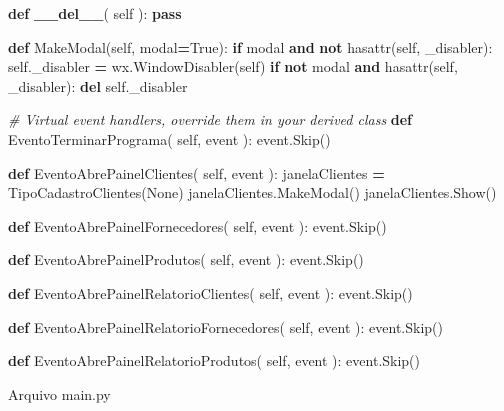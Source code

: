 \documentclass[
]{book}
\newenvironment{Shaded}{\begin{snugshade}}{\end{snugshade}}
\newcommand{\BuiltInTok}[1]{#1}
\newcommand{\CommentTok}[1]{\textcolor[rgb]{0.56,0.35,0.01}{\textit{#1}}}
\newcommand{\ControlFlowTok}[1]{\textcolor[rgb]{0.13,0.29,0.53}{\textbf{#1}}}
\newcommand{\FunctionTok}[1]{\textcolor[rgb]{0.13,0.29,0.53}{\textbf{#1}}}
\newcommand{\KeywordTok}[1]{\textcolor[rgb]{0.13,0.29,0.53}{\textbf{#1}}}
\newcommand{\NormalTok}[1]{#1}
\newcommand{\OperatorTok}[1]{\textcolor[rgb]{0.81,0.36,0.00}{\textbf{#1}}}
\newcommand{\StringTok}[1]{\textcolor[rgb]{0.31,0.60,0.02}{#1}}
\newcommand{\VariableTok}[1]{\textcolor[rgb]{0.00,0.00,0.00}{#1}}
\begin{document}
\begin{Shaded}
\begin{Highlighting}[]
   \KeywordTok{def} \FunctionTok{\_\_del\_\_}\NormalTok{( }\VariableTok{self}\NormalTok{ ):}
       \ControlFlowTok{pass}

   \KeywordTok{def}\NormalTok{ MakeModal(}\VariableTok{self}\NormalTok{, modal}\OperatorTok{=}\VariableTok{True}\NormalTok{):}
       \ControlFlowTok{if}\NormalTok{ modal }\KeywordTok{and} \KeywordTok{not} \BuiltInTok{hasattr}\NormalTok{(}\VariableTok{self}\NormalTok{, }\StringTok{\textquotesingle{}\_disabler\textquotesingle{}}\NormalTok{):}
           \VariableTok{self}\NormalTok{.\_disabler }\OperatorTok{=}\NormalTok{ wx.WindowDisabler(}\VariableTok{self}\NormalTok{)}
       \ControlFlowTok{if} \KeywordTok{not}\NormalTok{ modal }\KeywordTok{and} \BuiltInTok{hasattr}\NormalTok{(}\VariableTok{self}\NormalTok{, }\StringTok{\textquotesingle{}\_disabler\textquotesingle{}}\NormalTok{):}
           \KeywordTok{del} \VariableTok{self}\NormalTok{.\_disabler}

   \CommentTok{\# Virtual event handlers, override them in your derived class}
   \KeywordTok{def}\NormalTok{ EventoTerminarPrograma( }\VariableTok{self}\NormalTok{, event ):}
\NormalTok{       event.Skip()}

   \KeywordTok{def}\NormalTok{ EventoAbrePainelClientes( }\VariableTok{self}\NormalTok{, event ):}
\NormalTok{       janelaClientes }\OperatorTok{=}\NormalTok{ TipoCadastroClientes(}\VariableTok{None}\NormalTok{)}
\NormalTok{       janelaClientes.MakeModal()}
\NormalTok{       janelaClientes.Show()}
       

   \KeywordTok{def}\NormalTok{ EventoAbrePainelFornecedores( }\VariableTok{self}\NormalTok{, event ):}
\NormalTok{       event.Skip()}

   \KeywordTok{def}\NormalTok{ EventoAbrePainelProdutos( }\VariableTok{self}\NormalTok{, event ):}
\NormalTok{       event.Skip()}

   \KeywordTok{def}\NormalTok{ EventoAbrePainelRelatorioClientes( }\VariableTok{self}\NormalTok{, event ):}
\NormalTok{       event.Skip()}

   \KeywordTok{def}\NormalTok{ EventoAbrePainelRelatorioFornecedores( }\VariableTok{self}\NormalTok{, event ):}
\NormalTok{       event.Skip()}

   \KeywordTok{def}\NormalTok{ EventoAbrePainelRelatorioProdutos( }\VariableTok{self}\NormalTok{, event ):}
\NormalTok{       event.Skip()}
\end{Highlighting}
\end{Shaded}

Arquivo main.py
\end{document}
